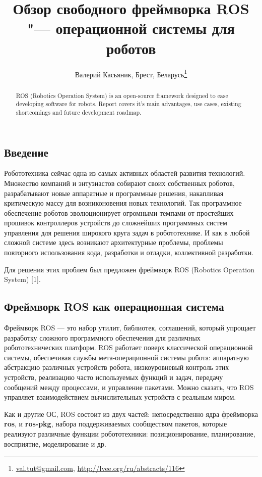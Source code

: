 \documentclass[10pt, a5paper]{article}
\begin{document}
\title{Обзор свободного фреймворка ROS "--- операционной системы для роботов}
\author{Валерий Касьяник, Брест, Беларусь\footnote{\url{val.tut@gmail.com}, \url{http://lvee.org/ru/abstracts/116}}}
\maketitle
\begin{abstract}
ROS (Robotics Operation System) is an open-source framework designed to ease developing software for robots. Report covers it's main  advantages, use cases, existing shortcomings and future development roadmap.
\end{abstract}
\subsection*{Введение}

Робототехника сейчас одна из самых активных областей развития технологий. Множество компаний и  энтузиастов собирают своих собственных роботов, разрабатывают новые аппаратные и программные решения, накапливая критическую массу для возниконовения новых технологий. Так программное обеспечение роботов эволюционирует огромными темпами от простейших прошивок контроллеров устройств до сложнейших программных систем управления для решения широкого круга задач в робототехнике. И как в любой сложной системе здесь возникают архитектурные проблемы, проблемы повторного использования кода, разработки и отладки, коллективной разработки.

Для решения этих проблем был предложен фреймворк ROS  (Robotics Operation System) [1].

\subsection*{Фреймворк ROS как операционная система}

Фреймворк ROS — это набор утилит, библиотек, соглашений, который упрощает разработку сложного программного обеспечения для различных робототехнических платформ. ROS работает поверх классической операционной системы, обеспечивая службы мета-операционной системы робота: аппаратную абстракцию различных устройств робота, низкоуровневый контроль этих устройств, реализацию часто используемых функций и задач, передачу сообщений между процессами, и управление пакетами. Можно сказать, что ROS управляет взаимодействием вычислительных устройств с реальным миром.

Как и другие ОС, ROS состоит из двух частей: непосредственно ядра фреймворка \textbf{ros}, и \textbf{ros-pkg}, набора поддерживаемых сообществом пакетов, которые реализуют различные функции робототехники: позиционирование, планирование, восприятие, моделирование и др.
\end{document}
